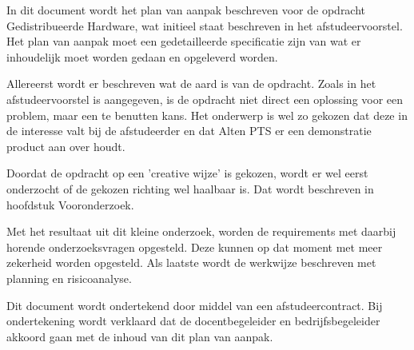 \documentclass{../local}
\begin{document}
In dit document wordt het plan van aanpak beschreven voor de opdracht Gedistribueerde Hardware, wat initieel staat beschreven in het afstudeervoorstel. Het plan van aanpak moet een gedetailleerde specificatie zijn van wat er inhoudelijk moet worden gedaan en opgeleverd worden.

Allereerst wordt er beschreven wat de aard is van de opdracht. Zoals in het afstudeervoorstel is aangegeven, is de opdracht niet direct een oplossing voor een problem, maar een te benutten kans. Het onderwerp is wel zo gekozen dat deze in de interesse valt bij de afstudeerder en dat Alten PTS er een demonstratie product aan over houdt. 

Doordat de opdracht op een 'creative wijze' is gekozen, wordt er wel eerst onderzocht of de gekozen richting wel haalbaar is. Dat wordt beschreven in hoofdstuk Vooronderzoek.

Met het resultaat uit dit kleine onderzoek, worden de requirements met daarbij horende onderzoeksvragen opgesteld. Deze kunnen op dat moment met meer zekerheid worden opgesteld. Als laatste wordt de werkwijze beschreven met planning en risicoanalyse.

Dit document wordt ondertekend door middel van een afstudeercontract. Bij ondertekening wordt verklaard dat de docentbegeleider en bedrijfsbegeleider akkoord gaan met de inhoud van dit plan van aanpak.
\end{document}
